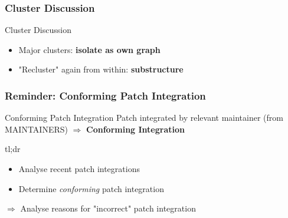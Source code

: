 \documentclass[12pt]{beamer}
\begin{document}
	\begin{frame}
	\frametitle{Cluster Discussion}
		\begin{block}{Cluster Discussion}
			\begin{itemize}
				\item Major clusters: \textbf{isolate as own graph}
				\item "Recluster" again from within: \textbf{substructure}
			\end{itemize}
		\end{block}
		
	\end{frame}

	\begin{frame}
	\frametitle{Reminder: Conforming Patch Integration} %
		\begin{alertblock}{Conforming Patch Integration}
			Patch integrated by relevant maintainer (from MAINTAINERS) $\Rightarrow$ \textbf{Conforming Integration}
		\end{alertblock}

		\begin{block}{tl;dr}
			\begin{itemize}
				\item Analyse recent patch integrations
				\item Determine \textit{conforming} patch integration
			\end{itemize}
		\end{block}
		$\Rightarrow$ Analyse reasons for "incorrect" patch integration
	\end{frame}
\end{document}
